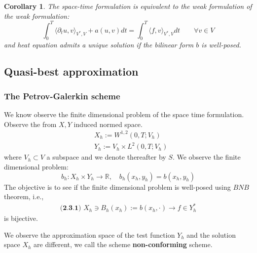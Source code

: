 \documentclass[a4paper,12pt,oneside,fleqn]{book}
\newtheorem{corollary}{Corollary}[theorem]
\theoremstyle{definition}
\theoremstyle{remark}
\begin{document}
\begin{corollary}
	The space-time formulation is equivalent to the weak formulation of the weak formulation:
	\begin{equation}
		\int_0^T \langle \partial_t u, v \rangle_{V^*, V} + a (u, v) dt = \int_0^T \langle f, v \rangle_{V^*, V} dt \qquad \forall v \in V
	\end{equation}
	and heat equation admits a unique solution if the bilinear form $b$ is well-posed. 
\end{corollary}


\subsection{Quasi-best approximation}
\subsubsection{The Petrov-Galerkin scheme}
We know observe the finite dimensional problem of the space time formulation. Observe the from $X, Y$ induced normed space. 
\begin{align*}
	&X_h:= W^{1, 2}(0, T; V_h)\\
	&Y_h:= V_h \times L^2(0, T; V_h) 
\end{align*}
where $V_h \subset V$ a subspace and we denote thereafter by $S$. We observe the finite dimensional problem:
\begin{equation}
	b_h: X_h \times Y_h \rightarrow \mathbb{R},\quad b_h (x_h, y_h) = b(x_h, y_h)
\end{equation}
The objective is to see if the finite dimensional problem is well-posed using $BNB$ theorem, i.e., 
\begin{align*} \textbf{(2.3.1) }
	X_h \ni B_h(x_h):= b(x_h, \cdot) \rightarrow f \in Y_h^*
\end{align*}
is bijective. \par 

We observe the approximation space of the test function $Y_h$ and the solution space $X_h$ are different, we call the scheme \textbf{non-conforming } scheme. 
\end{document}
